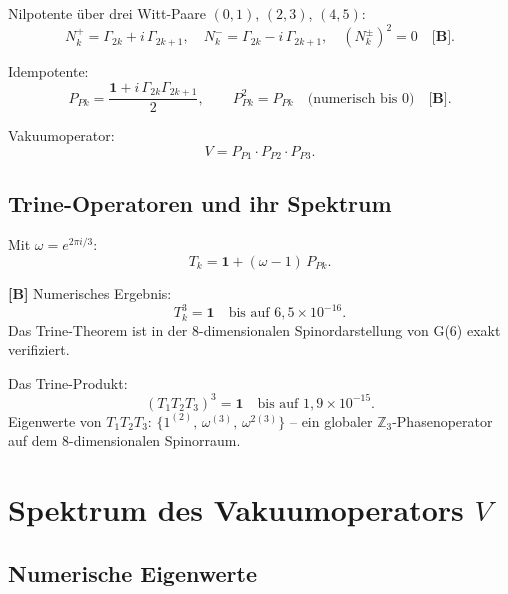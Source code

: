 Nilpotente über drei Witt-Paare $(0,1)$, $(2,3)$, $(4,5)$:
\begin{equation}
  N_k^+ = \Gamma_{2k} + i\,\Gamma_{2k+1}, \quad
  N_k^- = \Gamma_{2k} - i\,\Gamma_{2k+1}, \quad
  (N_k^\pm)^2 = 0 \quad \textbf{[B]}.
\end{equation}

Idempotente:
\begin{equation}
  P_{Pk} = \frac{\mathbf{1} + i\,\Gamma_{2k}\Gamma_{2k+1}}{2},
  \qquad P_{Pk}^2 = P_{Pk} \quad \text{(numerisch bis } 0\text{)} \quad \textbf{[B]}.
\end{equation}

Vakuumoperator:
\begin{equation}
  V = P_{P1}\cdot P_{P2}\cdot P_{P3}.
  \label{eq:V_def}
\end{equation}

\subsection{Trine-Operatoren und ihr Spektrum}

Mit $\omega = e^{2\pi i/3}$:
\begin{equation}
  T_k = \mathbf{1} + (\omega - 1)\,P_{Pk}.
  \label{eq:trine_def}
\end{equation}

\textbf{[B]} Numerisches Ergebnis:
\begin{equation}
  T_k^3 = \mathbf{1} \quad \text{bis auf } 6{,}5\times10^{-16}.
\end{equation}
Das Trine-Theorem ist in der 8-dimensionalen Spinordarstellung
von G(6) exakt verifiziert.

Das Trine-Produkt:
\begin{equation}
  (T_1 T_2 T_3)^3 = \mathbf{1} \quad \text{bis auf } 1{,}9\times10^{-15}.
\end{equation}
Eigenwerte von $T_1 T_2 T_3$: $\{1^{(2)},\, \omega^{(3)},\, \omega^{2(3)}\}$ --
ein globaler $\mathbb{Z}_3$-Phasenoperator auf dem 8-dimensionalen Spinorraum.

\section{Spektrum des Vakuumoperators $V$}

\subsection{Numerische Eigenwerte}

